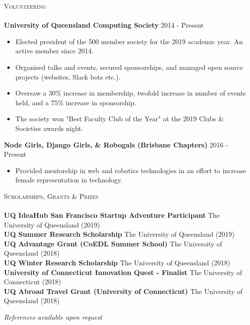 \documentclass[a4paper]{article}
\newcommand{\lineunder} {
    \vspace*{-8pt} \\
    \hspace*{-10pt} \hrulefill \\
}
\newcommand{\header} [1] {
    {\hspace*{-10pt}\vspace*{6pt} \textsc{#1}}
    \vspace*{-6pt} \lineunder
}
\newenvironment{singleitem}
{   \small
    \vspace{0pt}
    \begin{itemize}
    \setlength{\itemsep}{0pt}
    \setlength{\parskip}{0pt}
    \setlength{\parsep}{0pt}   }
{\end{itemize} \vspace{1pt}	}
\begin{document}
\header{Volunteering}
\textbf{University of Queensland Computing Society} \hfill 2014 - Present\\
\begin{singleitem}
	\item Elected president of the 500 member society for the 2019 academic year.  An active member since 2014.
	\item Organised talks and events, secured sponsorships, and managed open source projects (websites, Slack bots etc.).
	\item Oversaw a 30\% increase in membership, twofold increase in number of events held, and a 75\% increase in sponsorship.
	\item The society won "Best Faculty Club of the Year" at the 2019 Clubs \& Societies awards night.
\end{singleitem}
\textbf{Node Girls, Django Girls, \& Robogals (Brisbane Chapters)} \hfill 2016 - Present\\
\begin{singleitem}
	\item Provided mentorship in web and robotics technologies in an effort to increase female representation in technology.
\end{singleitem}

\vspace{1mm}

\header{Scholarships, Grants \& Prizes}
\textbf{UQ IdeaHub San Francisco Startup Adventure Participant} \hfill The University of Queensland (2019)\\
\textbf{UQ Summer Research Scholarship} \hfill The University of Queensland (2019)\\
\textbf{UQ Advantage Grant (CoEDL Summer School)} \hfill The University of Queensland (2018)\\
\textbf{UQ Winter Research Scholarship} \hfill The University of Queensland (2018)\\
\textbf{University of Connecticut Innovation Quest - Finalist} \hfill The University of Connecticut (2018)\\
\textbf{UQ Abroad Travel Grant (University of Connecticut)} \hfill The University of Queensland (2018)\\


\vspace{3mm}
\begin{center}
\small \textit{References available upon request}
\end{center}
\end{document}
